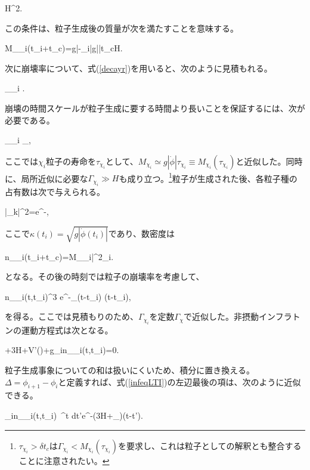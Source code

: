 \be\label{c1}
H^2.
\ee

この条件は、粒子生成後の質量が次を満たすことを意味する。

\be M_{\chi_i}(t_i+\delta t_c)=g|\phi-\phi_i|\simeq g|\dot{\phi}|\delta t_c\gg H.
\ee

次に崩壊率について、式(\ref{decayr})を用いると、次のように見積もれる。

\beq
\Gamma_{\chi_i} \simeq  {}. \label{gammab}
\eeq

崩壊の時間スケールが粒子生成に要する時間より長いことを保証するには、次が必要である。

\beq
\label{c2n}
 \simeq {}\gtrsim \Gamma_{\chi_i}\simeq{} \quad\to\quad  \Lambda_\varphi \gtrsim {},
\eeq

ここでは$\chi_i$粒子の寿命を$\tau_{\chi_i}$として、$M_{\chi_i}\simeq g|\dot\phi|\tau_{\chi_i}\equiv M_{\chi_i}(\tau_{\chi_i})$と近似した。同時に、局所近似に必要な$\Gamma_{\chi_i}\gg H$も成り立つ。\footnote{$\tau_{\chi_i}>\delta t_c$は$\Gamma_{\chi_i}<M_{\chi_i}(\tau_{\chi_i})$を要求し、これは粒子としての解釈とも整合することに注意されたい。}粒子が生成された後、各粒子種の占有数は次で与えられる。

\beq
\label{ocupnum}
|\beta_k|^2=e^{-},
\eeq

ここで$\kappa(t_i)=\sqrt{g|\dot\phi(t_i)|}$であり、数密度は

\be\label{nchim} n_{\chi_i}(t_i+\delta t_c)=M_{\chi_i}\bar\chi^2_i\simeq {}.\ee

となる。その後の時刻では粒子の崩壊率を考慮して、

\be n_{\chi_i}(t,t_i)\simeq {}\lp{}\rp^3 e^{-\Gamma_{\chi}(t-t_i)} \; \Theta(t-t_i),\ee

を得る。ここでは見積もりのため、$\Gamma_{\chi_i}$を定数$\Gamma_\chi$で近似した。非摂動インフラトンの運動方程式は次となる。

\be\label{infeqLTI}\ddot{\phi}+3H\dot{\phi}+V'(\phi)+g\sum_in_{\chi_i}(t,t_i)=0.\ee

粒子生成事象についての和は扱いにくいため、積分に置き換える。$\Delta=\phi_{i+1}-\phi_i$と定義すれば、式(\ref{infeqLTI})の左辺最後の項は、次のように近似できる。

\beq
\sum_in_{\chi_i}(t,t_i)\simeq~\int^t dt'e^{-(3H+\Gamma_{\chi})(t-t')}.
\eeq

